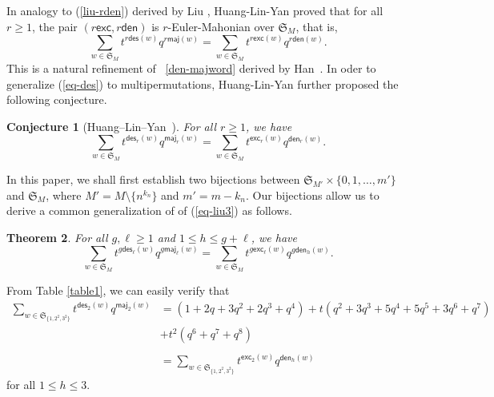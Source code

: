 \documentclass[12pt]{article}
\numberwithin{equation}{section}
\theoremstyle{plain}
\newtheorem{theorem}{Theorem}[section]
\newtheorem{conjecture}[theorem]{Conjecture}
\def\des{\mathsf{des}}
\def\maj{\mathsf{maj}}
\def\exc{\mathsf{exc}}
\def\den{\mathsf{den}}
\begin{document}
In analogy to (\ref{liu-rden}) derived by Liu \cite{Liujcta}, 	 Huang-Lin-Yan \cite{Huang-lin-yan2} proved that 	for all $r\geq 1$,   the pair $(r\exc, r\den)$ is $r$-Euler-Mahonian over $\mathfrak{S}_M$, that is,  
	\begin{equation}\label{eq-Huang-JCTA2}
		\sum_{w\in\mathfrak{S}_M} t^{r\des(w)} q^{r\maj(w)}
		=\sum_{w\in \mathfrak{S}_M} t^{r\exc(w)}  q^{r\den(w)}.			
	\end{equation}	
	This is a   natural refinement of ~\eqref{den-majword} derived by Han~\cite{Han1}.  
In oder to 	generalize   (\ref{eq-des}) to multipermutations,   Huang-Lin-Yan \cite{Huang-lin-yan2}  further proposed the following  conjecture.   
	\begin{conjecture}[Huang--Lin--Yan~\cite{Huang-lin-yan2}]\label{con-rden-word}
		For all $r\geq 1$, we have 
		\begin{equation}
			\sum_{w\in\mathfrak{S}_M} t^{\des_r(w)} q^{\maj_r(w)}
			=\sum_{w\in \mathfrak{S}_M} t^{\exc_r(w)}  q^{\den_r(w)}.			
		\end{equation}	
	\end{conjecture} 
 
 

 
 In this paper, we shall  first  establish   two  bijections between $\mathfrak{S}_{M'}\times \{0, 1,\ldots, m'\}$ and $\mathfrak{S}_{M}$, where $M'=M\setminus \{n^{k_n}\}$  and $m'=m-k_n$. Our bijections  allow   us to 
 derive a common   generalization of     of (\ref{eq-liu3})  as follows. 
 
 	\begin{theorem}\label{thm-den-r-h}
 	For all $g,\ell\geq 1$ and $1\leq h\leq g+\ell$, we have 
 	\begin{equation}\label{eq-den-r-h}
 		\sum_{w\in\mathfrak{S}_M} t^{g\des_\ell(w)} q^{g\maj_\ell(w)}
 		=\sum_{w\in \mathfrak{S}_M} t^{g\exc_\ell(w)}  q^{g\den_h(w)}.			
 	\end{equation}	
 \end{theorem} 
From Table \ref{table1}, we can easily  verify  that 
$$
\begin{array}{lll}
	\sum\limits_{w\in \mathfrak{S}_{\{{1,2^2,3^2}\}}}  t^{\des_2(w)}q^{\maj_2(w)}
	&=(1+2q+3q^2+2q^3+q^4)+t(q^2+3q^3+5q^4+5q^5+3q^6+q^7)\\
	&+t^2(q^6+q^7+q^8)\\
	&&\\
	&=\sum\limits_{w\in \mathfrak{S}_{\{{1,2^2,3^2}\}}}  t^{\exc_2(w)}q^{\den_h(w)} 
\end{array}
$$
for all $1\leq h\leq 3$. 
\end{document}
